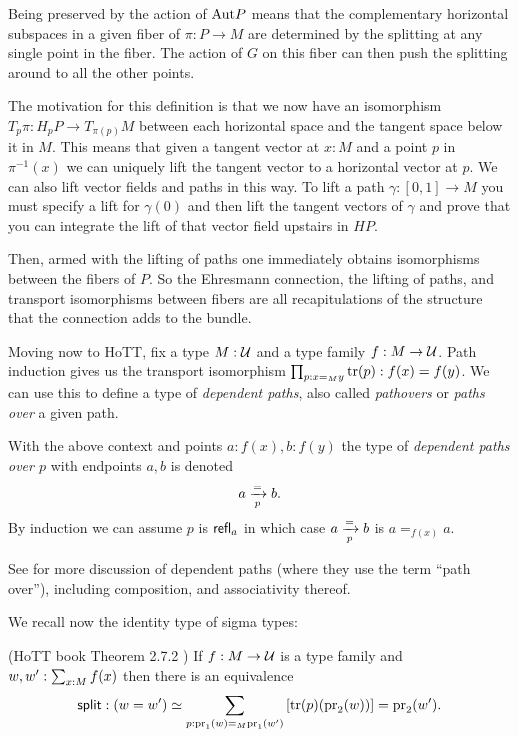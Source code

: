 Being preserved by the action of \(\mathrm{Aut} P\) means that the complementary
horizontal subspaces in a given fiber of \(\pi:P\to M\) are determined
by the splitting at any single point in the fiber. The action of \(G\)
on this fiber can then push the splitting around to all the other
points.

The motivation for this definition is that we now have an isomorphism
\(T_p\pi:H_pP\to T_{\pi(p)}M\) between each horizontal space and the
tangent space below it in \(M\). This means that given a tangent vector
at \(x:M\) and a point \(p\) in \(\pi^{-1}(x)\) we can uniquely lift the
tangent vector to a horizontal vector at \(p\). We can also lift vector
fields and paths in this way. To lift a path \(\gamma:[0,1]\to M\) you
must specify a lift for \(\gamma(0)\) and then lift the tangent vectors
of \(\gamma\) and prove that you can integrate the lift of that vector
field upstairs in \(HP\).

Then, armed with the lifting of paths one immediately obtains
isomorphisms between the fibers of \(P\). So the Ehresmann connection,
the lifting of paths, and transport isomorphisms between fibers are all
recapitulations of the structure that the connection adds to the bundle.

Moving now to HoTT, fix a type \(M:\mathcal{U}\) and a type family \(f:M\to\mathcal{U}\).
Path induction gives us the transport isomorphism
\(\prod_{p:x=_M y}\mathrm{tr}(p):f(x)=f(y)\). We can use this to define a type of
\emph{dependent paths}, also called \emph{pathovers} or \emph{paths
over} a given path.

\begin{mydef}
With the above context and points \( a:f(x), b:f(y) \) the type of \emph{dependent paths over \( p \)} with endpoints \( a, b \) is denoted
\[ a\xrightarrow[{p}]{=}b.
\]
By induction we can assume \( p \) is \( \mathsf{refl}_a \) in which case \( a\xrightarrow[{p}]{=}b \) is \( a=_{f(x)}a \).
\end{mydef}

See \cite{Symmetry} for more discussion of dependent paths (where they
use the term ``path over''), including composition, and associativity
thereof.

We recall now the identity type of sigma types:

\begin{mythm}\label{thm:idsit}
(HoTT book Theorem 2.7.2 \cite{hottbook}) If \( f:M\to \mathcal{U} \) is a type family and \( w,w':\sum_{x:M}f(x) \) then there is an equivalence 
\[ 
\mathsf{split}:(w=w')\simeq \sum_{p:\mathrm{pr}_1(w)=_M\mathrm{pr}_1(w')} \left[\mathrm{tr}(p)(\mathrm{pr}_2(w))\right] = \mathrm{pr}_2(w').
\]
\end{mythm}

